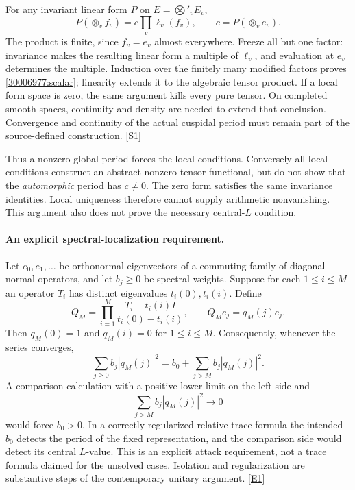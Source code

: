 \documentclass[11pt,a4paper]{article}
\newcommand{\sref}[2]{\hyperlink{source:#1:#2}{[S#2]}}
\newcommand{\eref}[2]{\hyperlink{extra:#1:#2}{[E#2]}}
\numberwithin{equation}{section}
\begin{document}
For any invariant linear form $P$ on $E=\bigotimes'_vE_v$,
\begin{equation}\label{30006977:scalar}
 P(\otimes_v f_v)=c\prod_v\ell_v(f_v),\qquad c=P(\otimes_v e_v).
\end{equation}
The product is finite, since $f_v=e_v$ almost everywhere. Freeze all but
one factor: invariance makes the resulting linear form a multiple of
$\ell_v$, and evaluation at $e_v$ determines the multiple. Induction over
the finitely many modified factors proves \eqref{30006977:scalar}; linearity
extends it to the algebraic tensor product. If a local form space is zero,
the same argument kills every pure tensor. On completed smooth spaces,
continuity and density are needed to extend that conclusion. Convergence
and continuity of the actual cuspidal period must remain part of the
source-defined construction. \sref{30006977}{1}

Thus a nonzero global period forces the local conditions. Conversely all
local conditions construct an abstract nonzero tensor functional, but do
not show that the \emph{automorphic} period has $c\ne0$. The zero form
satisfies the same invariance identities. Local uniqueness therefore cannot
supply arithmetic nonvanishing. This argument also does not prove the
necessary central-$L$ condition.

\paragraph{An explicit spectral-localization requirement.}
Let $e_0,e_1,\ldots$ be orthonormal eigenvectors of a commuting family of
diagonal normal operators, and let $b_j\ge0$ be spectral weights. Suppose
for each $1\le i\le M$ an operator $T_i$ has distinct eigenvalues
$t_i(0),t_i(i)$. Define
\[
 Q_M=\prod_{i=1}^M\frac{T_i-t_i(i)I}{t_i(0)-t_i(i)},
 \qquad Q_Me_j=q_M(j)e_j.
\]
Then $q_M(0)=1$ and $q_M(i)=0$ for $1\le i\le M$. Consequently, whenever
the series converges,
\begin{equation}\label{30006977:filter}
 \sum_{j\ge0}b_j|q_M(j)|^2
       =b_0+\sum_{j>M}b_j|q_M(j)|^2.
\end{equation}
A comparison calculation with a positive lower limit on the left side and
\[
 \sum_{j>M}b_j|q_M(j)|^2\longrightarrow0
\]
would force $b_0>0$. In a correctly regularized relative trace formula the
intended $b_0$ detects the period of the fixed representation, and the
comparison side would detect its central $L$-value. This is an explicit
attack requirement, not a trace formula claimed for the unsolved cases.
Isolation and regularization are substantive steps of the contemporary
unitary argument. \eref{30006977}{1}
\end{document}

